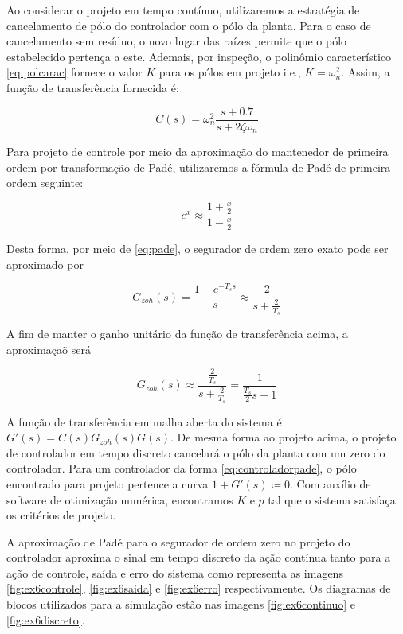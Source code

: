     Ao considerar o projeto em tempo contínuo, utilizaremos a estratégia de cancelamento de pólo do controlador com o pólo da planta. Para o caso de cancelamento sem resíduo, o novo lugar das raízes permite que o pólo estabelecido pertença a este. Ademais, por inspeção, o polinômio característico \eqref{eq:polcarac} fornece o valor $K$ para os pólos em projeto i.e., $K = \omega_n^2$. Assim, a função de transferência fornecida é:
    
        \begin{equation}
            C(s) = \omega_n^2 \frac{s + 0.7}{s + 2 \zeta \omega_n}
        \end{equation}
        
    Para projeto de controle por meio da aproximação do mantenedor de primeira ordem por transformação de Padé, utilizaremos a fórmula de Padé de primeira ordem seguinte:
    
        \begin{equation}
        e^{x} \approx \frac{1 + \frac{x}{2}}{1 - \frac{x}{2}}
        \label{eq:pade}
        \end{equation}
    
    Desta forma, por meio de \eqref{eq:pade}, o segurador de ordem zero exato pode ser aproximado por
    
        \begin{equation}
        G_{zoh}(s) = \frac{1 - e^{-T_s s}}{s} \approx \frac{2}{ s + \frac{2}{T_s}}
        \end{equation}
    
    A fim de manter o ganho unitário da função de transferência acima, a aproximaçaõ será 
    
        \begin{equation}
        G_{zoh}(s) \approx \frac{\frac{2}{T_s}}{s + \frac{2}{T_s}} = \frac{1}{\frac{T_s}{2} s + 1} 
        \end{equation}
    
    A função de transferência em malha aberta do sistema é $G'(s) = C(s)G_{zoh}(s)G(s)$. De mesma forma ao projeto acima, o projeto de controlador em tempo discreto cancelará o pólo da planta com um zero do controlador. Para um controlador da forma \eqref{eq:controladorpade}, o pólo encontrado para projeto pertence a curva $1 + G'(s) \coloneqq 0$.   Com auxílio de software de otimização numérica, encontramos $K$ e $p$ tal que o sistema satisfaça os critérios de  projeto. 
    
    A aproximação de Padé para o segurador de ordem zero no projeto do controlador aproxima o sinal em tempo discreto da ação contínua tanto para a ação de controle, saída e erro do sistema como representa as imagens \ref{fig:ex6controle}, \ref{fig:ex6saida} e \ref{fig:ex6erro}  respectivamente. Os diagramas de blocos utilizados para a simulação estão nas imagens \ref{fig:ex6continuo} e \ref{fig:ex6discreto}.
    
